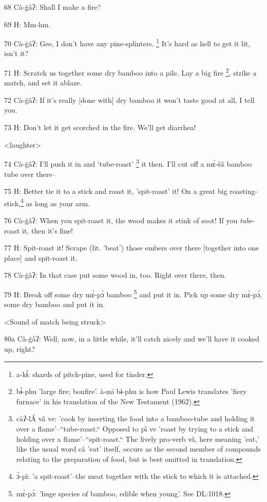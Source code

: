 68 Cà-g̈âʔ: Shall I make a fire?

69 H: Mm-hm.

70  Cà-g̈âʔ: Gee, I don't have any pine-splinters. \footnote{a-kɨ́: shards of pitch-pine, used for tinder.} It's hard as hell to
get it lit, isn't it?

71 H: Scratch us together some dry bamboo into a pile. Lay a big fire \footnote{bɨ̀-phu 'large fire; bonfire'. à-mī bɨ-phu is how Paul Lewis translates 'fiery furnace' in his translation of the New Testament (1962).}, strike
a match, and set it ablaze.

72  Cà-g̈âʔ: If it's really [done with] dry bamboo it won't taste good at all,
I tell you.

73 H: Don't let it get scorched in the fire. We'll get diarrhea!

\begin{center}
<laughter>
\end{center}

\leftskip=0pt
74  Cà-g̈âʔ: I'll push it in and 'tube-roast' \footnote{càʔ-lÁ vâ ve: 'cook by inserting the food into a bamboo-tube and holding it over a flame'--``tube-roast.`` Opposed to pì ve 'roast by trying to a stick and holding over a flame'--``spit-roast.`` The lively pro-verb vâ, here meaning 'eat,' like the usual word câ 'eat' itself, occurs as the second member of compounds relating to the preparation of food, but is best omitted in translation.} it then. I'll cut off a
mɛ̀-šâ bamboo tube over there--

75 H: Better tie it to a stick and roast it, 'spit-roast' it! On a great big roasting-stick,\footnote{ɔ̀-pì: 'a spit-roast'--the meat together with the stick to which it is attached.}
as long as your arm.

76  Cà-g̈âʔ: When you spit-roast it, the wood makes it stink of soot! If you
\emph{tube}-roast it, then it's fine!

77 H: Spit-roast it! Scrape (lit. 'beat') those embers over there [together into
one place] and spit-roast it.

78  Cà-g̈âʔ: In that case put some wood in, too. Right over there, then.

79 H: Break off some dry mɛ̀-pɔ̀ bamboo \footnote{mɛ̀-pɔ̀: 'huge species of bamboo, edible when young'. See DL:1018.} and put it in. Pick up some dry
mɛ̀-pɔ̀, some dry bamboo and put it in.

<Sound of match being struck>

80a  Cà-g̈âʔ: Well, now, in a little while, it'll catch nicely and we'll have
it cooked up, right?

